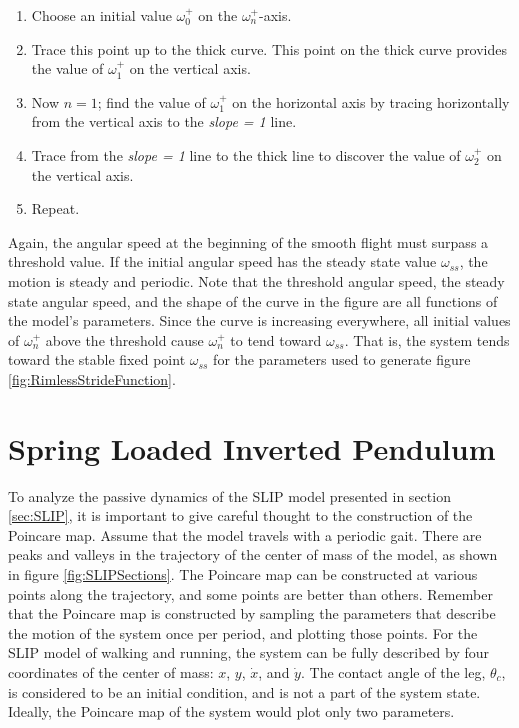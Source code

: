 \begin{enumerate}
\item Choose an initial value $\omega_{0}^{+}$ on the $\omega_{n}^{+}$-axis.
\item Trace this point up to the thick curve. This point on the thick curve provides the value of $\omega_{1}^{+}$ on the vertical axis.
\item Now $n = 1$; find the value of $\omega_{1}^{+}$ on the horizontal axis by tracing horizontally from the vertical axis to the \textit{slope = 1} line.
\item Trace from the \textit{slope = 1} line to the thick line to discover the value of $\omega_{2}^{+}$ on the vertical axis.
\item Repeat.
\end{enumerate}

Again, the angular speed at the beginning of the smooth flight must surpass a threshold value. If the initial angular speed has the steady state value $\omega_{ss}$, the motion is steady and periodic. Note that the threshold angular speed, the steady state angular speed, and the shape of the curve in the figure are all functions of the model's parameters. Since the curve is increasing everywhere, all initial values of $\omega_n^+$ above the threshold cause $\omega_n^+$ to tend toward $\omega_{ss}$. That is, the system tends toward the stable fixed point $\omega_{ss}$ for the parameters used to generate figure \ref{fig:RimlessStrideFunction}.

\section{Spring Loaded Inverted Pendulum} %
\label{sec:SpringLoadedInvertedPendulum}

To analyze the passive dynamics of the SLIP model presented in section \ref{sec:SLIP}, it is important to give careful thought to the construction of the Poincare map. Assume that the model travels with a periodic gait. There are peaks and valleys in the trajectory of the center of mass of the model, as shown in figure \ref{fig:SLIPSections}. The Poincare map can be constructed at various points along the trajectory, and some points are better than others. Remember that the Poincare map is constructed by sampling the parameters that describe the motion of the system once per period, and plotting those points. For the SLIP model of walking and running, the system can be fully described by four coordinates of the center of mass: $x$, $y$, $\dot{x}$, and $\dot{y}$. The contact angle of the leg, $\theta_{c}$, is considered to be an initial condition, and is not a part of the system state. Ideally, the Poincare map of the system would plot only two parameters. 

